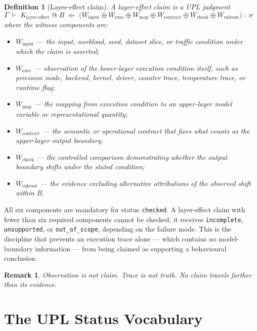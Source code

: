 \documentclass[11pt, a4paper]{article}
\theoremstyle{upldef}
\newtheorem{definition}{Definition}
\newtheorem{remark}{Remark}
\newcommand{\witness}[1]{\ensuremath{W_{\text{#1}}}}
\newcommand{\statuslabel}[1]{\texttt{\small #1}}
\begin{document}
\begin{definition}[Layer-effect claim]\label{def:layereffect}
A layer-effect claim is a UPL judgment
\[
\Gamma \;\vdash\; K_{\text{layer-effect}} \;@\; B
\;\Leftarrow\;
\bigl(\witness{input} \oplus \witness{exec} \oplus \witness{map}
\oplus \witness{contract} \oplus \witness{check} \oplus \witness{ruleout}\bigr)
\;:\; \sigma
\]
where the witness components are:
\begin{itemize}
\item $\witness{input}$ --- the input, workload, seed, dataset slice,
or traffic condition under which the claim is asserted;
\item $\witness{exec}$ --- observation of the lower-layer execution
condition itself, such as precision mode, backend, kernel, driver,
counter trace, temperature trace, or runtime flag;
\item $\witness{map}$ --- the mapping from execution condition to an
upper-layer model variable or representational quantity;
\item $\witness{contract}$ --- the semantic or operational contract
that fixes what counts as the upper-layer output boundary;
\item $\witness{check}$ --- the controlled comparison demonstrating
whether the output boundary shifts under the stated condition;
\item $\witness{ruleout}$ --- the evidence excluding alternative
attributions of the observed shift within $B$.
\end{itemize}
\end{definition}

\noindent
All six components are mandatory for status \statuslabel{checked}.
A layer-effect claim with fewer than six required components cannot
be checked; it receives \statuslabel{incomplete},
\statuslabel{unsupported}, or \statuslabel{out\_of\_scope}, depending
on the failure mode. This is the discipline that prevents an
execution trace alone --- which contains no model-boundary
information --- from being claimed as supporting a behavioural
conclusion.

\begin{remark}
Observation is not claim. Trace is not truth. No claim travels
farther than its evidence.
\end{remark}

\section{The UPL Status Vocabulary}
\label{sec:logictable}
\end{document}
